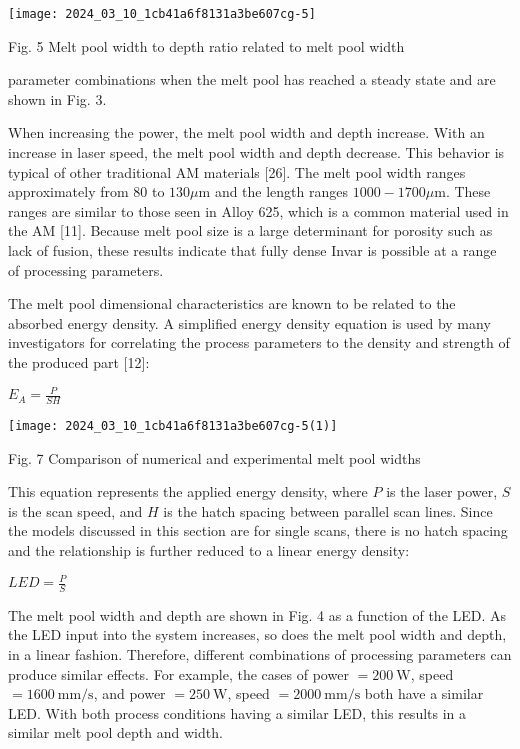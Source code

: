 \documentclass[10pt]{article}
\begin{document}
\begin{center}
\texttt{[image: 2024\_03\_10\_1cb41a6f8131a3be607cg-5]}
\end{center}

Fig. 5 Melt pool width to depth ratio related to melt pool width

parameter combinations when the melt pool has reached a steady state and are shown in Fig. 3.

When increasing the power, the melt pool width and depth increase. With an increase in laser speed, the melt pool width and depth decrease. This behavior is typical of other traditional AM materials [26]. The melt pool width ranges approximately from 80 to $130 \mu \mathrm{m}$ and the length ranges $1000-1700 \mu \mathrm{m}$. These ranges are similar to those seen in Alloy 625, which is a common material used in the AM [11]. Because melt pool size is a large determinant for porosity such as lack of fusion, these results indicate that fully dense Invar is possible at a range of processing parameters.

The melt pool dimensional characteristics are known to be related to the absorbed energy density. A simplified energy density equation is used by many investigators for correlating the process parameters to the density and strength of the produced part [12]:

$E_{A}=\frac{P}{S H}$

\begin{center}
\texttt{[image: 2024\_03\_10\_1cb41a6f8131a3be607cg-5(1)]}
\end{center}

Fig. 7 Comparison of numerical and experimental melt pool widths

This equation represents the applied energy density, where $P$ is the laser power, $S$ is the scan speed, and $H$ is the hatch spacing between parallel scan lines. Since the models discussed in this section are for single scans, there is no hatch spacing and the relationship is further reduced to a linear energy density:

$L E D=\frac{P}{S}$

The melt pool width and depth are shown in Fig. 4 as a function of the LED. As the LED input into the system increases, so does the melt pool width and depth, in a linear fashion. Therefore, different combinations of processing parameters can produce similar effects. For example, the cases of power $=200 \mathrm{~W}$, speed $=1600 \mathrm{~mm} / \mathrm{s}$, and power $=250 \mathrm{~W}$, speed $=2000 \mathrm{~mm} / \mathrm{s}$ both have a similar LED. With both process conditions having a similar LED, this results in a similar melt pool depth and width.
\end{document}
